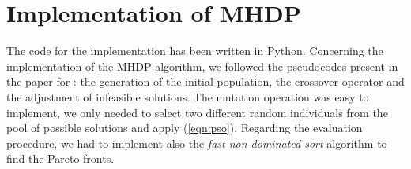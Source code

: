 \section{Implementation of MHDP}
The code for the implementation has been written in Python.
Concerning the implementation of the MHDP algorithm, we followed the pseudocodes present in the paper for : the generation of the initial population, the crossover operator
and the adjustment of infeasible solutions.
The mutation operation was easy to implement, we only needed to select two different random individuals from the pool of possible solutions and apply (\ref{eqn:pso}).
Regarding the evaluation procedure, we had to implement also the 
\textit{fast non-dominated sort} algorithm to find the Pareto fronts.
